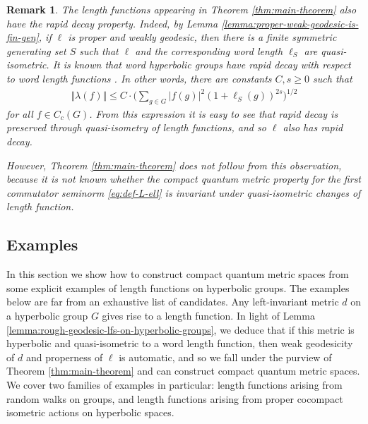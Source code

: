 \documentclass[12pt,a4paper,oneside,final,reqno]{amsart}
\theoremstyle{plain}
\newtheorem{remark}[theorem]{Remark}
\theoremstyle{definition}
\begin{document}
\begin{remark}
    The length functions appearing in Theorem \ref{thm:main-theorem} also have the rapid decay property. Indeed, by Lemma \ref{lemma:proper-weak-geodesic-is-fin-gen}, if $\ell$ is proper and weakly geodesic, then there is a finite symmetric generating set $S$ such that $\ell$ and the corresponding word length $\ell_S$ are quasi-isometric. It is known that word hyperbolic groups have rapid decay with respect to word length functions \cite{delaHarpeHyperbolic88, JolissaintRD90}. In other words, there are constants $C,s \geq 0$ such that
    \begin{align*}
        \Vert \lambda(f) \Vert \leq C \cdot \bigg( \sum_{g \in G} \vert f(g) \vert^2 (1+ \ell_S(g) )^{2s} \bigg)^{1/2}
    \end{align*}
    for all $f \in C_c(G)$. From this expression it is easy to see that rapid decay is preserved through quasi-isometry of length functions, and so $\ell$ also has rapid decay.

    However, Theorem \ref{thm:main-theorem} does not follow from this observation, because it is not known whether the compact quantum metric property for the first commutator seminorm \eqref{eq:def-L-ell} is invariant under quasi-isometric changes of length function. 
\end{remark}

\subsection{Examples}\label{subsec:Examples}
In this section we show how to construct compact quantum metric spaces from some explicit examples of length functions on hyperbolic groups. The examples below are far from an exhaustive list of candidates. Any left-invariant metric $d$ on a hyperbolic group $G$ gives rise to a length function. In light of Lemma \ref{lemma:rough-geodesic-lfs-on-hyperbolic-groups}, we deduce that if this metric is hyperbolic and quasi-isometric to a word length function, then weak geodesicity of $d$ and properness of $\ell$ is automatic, and so we fall under the purview of Theorem \ref{thm:main-theorem} and can construct compact quantum metric spaces. We cover two families of examples in particular: length functions arising from random walks on groups, and length functions arising from proper cocompact isometric actions on hyperbolic spaces.  
\end{document}
